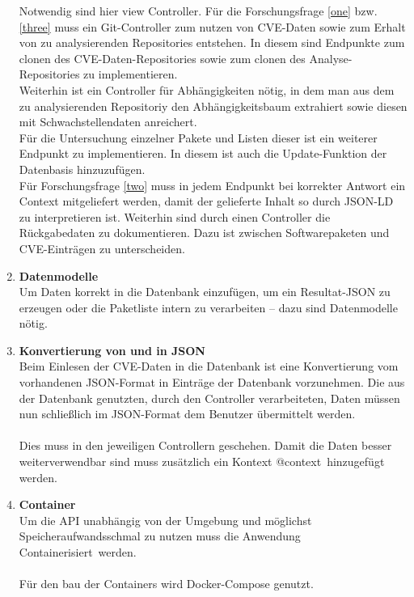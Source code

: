 \begin{enumerate}
            Notwendig sind hier view Controller.
            Für die Forschungsfrage \ref{one} bzw. \ref{three} muss ein Git-Controller zum nutzen von CVE-Daten sowie zum Erhalt von zu analysierenden Repositories entstehen.
            In diesem sind Endpunkte zum clonen des CVE-Daten-Repositories sowie zum clonen des Analyse-Repositories zu implementieren. %
            \\
            Weiterhin ist ein Controller für Abhängigkeiten nötig, in dem man aus dem zu analysierenden Repositoriy den Abhängigkeitsbaum extrahiert sowie diesen mit Schwachstellendaten anreichert.
            \\
            Für die Untersuchung einzelner Pakete und Listen dieser ist ein weiterer Endpunkt zu implementieren.
            In diesem ist auch die Update-Funktion der Datenbasis hinzuzufügen.
            \\
            Für Forschungsfrage \ref{two} muss in jedem Endpunkt bei korrekter Antwort ein Context mitgeliefert werden, damit der gelieferte Inhalt so durch JSON-LD zu interpretieren ist.
            Weiterhin sind durch einen Controller die Rückgabedaten zu dokumentieren.
            Dazu ist zwischen Softwarepaketen und CVE-Einträgen zu unterscheiden.
        \item \textbf{Datenmodelle} \label{arch_4}\\
            Um Daten korrekt in die Datenbank einzufügen, um ein Resultat-JSON zu erzeugen oder die Paketliste intern zu verarbeiten -- dazu sind Datenmodelle nötig.
        \item \textbf{Konvertierung von und in JSON} \label{arch_5}\\
            Beim Einlesen der CVE-Daten in die Datenbank ist eine Konvertierung vom vorhandenen JSON-Format in Einträge der Datenbank vorzunehmen.  
            Die aus der Datenbank genutzten, durch den Controller verarbeiteten, Daten müssen nun schließlich im JSON-Format dem Benutzer übermittelt werden.
            \\ \\
            Dies muss in den jeweiligen Controllern geschehen.
            Damit die Daten besser weiterverwendbar sind muss zusätzlich ein Kontext \glqq @context\grqq~hinzugefügt werden.
        \item \textbf{Container} \\
            Um die API unabhängig von der Umgebung und möglichst Speicheraufwandsschmal zu nutzen muss die Anwendung \glqq Containerisiert\grqq~werden.
            \\ \\
            Für den bau der Containers wird Docker-Compose genutzt.
    \end{enumerate}